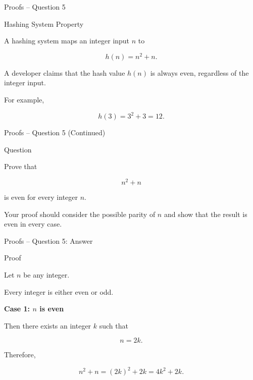 \begin{frame}{Proofs -- Question 5}

\begin{block}{Hashing System Property}

A hashing system maps an integer input $n$ to

\[
h(n)=n^2+n.
\]

A developer claims that the hash value $h(n)$ is always even, regardless
of the integer input.

\medskip

For example,

\[
h(3)=3^2+3=12.
\]

\end{block}

\end{frame}


\begin{frame}{Proofs -- Question 5 (Continued)}

\begin{block}{Question}

Prove that

\[
n^2+n
\]

is even for every integer $n$.

\medskip

Your proof should consider the possible parity of $n$ and show that the
result is even in every case.

\end{block}

\end{frame}


\begin{frame}{Proofs -- Question 5: Answer}

\begin{exampleblock}{Proof}

Let $n$ be any integer.

Every integer is either even or odd.

\medskip

\textbf{Case 1: $n$ is even}

Then there exists an integer $k$ such that

\[
n=2k.
\]

Therefore,

\[
n^2+n
=
(2k)^2+2k
=
4k^2+2k.
\]

\end{exampleblock}

\end{frame}

